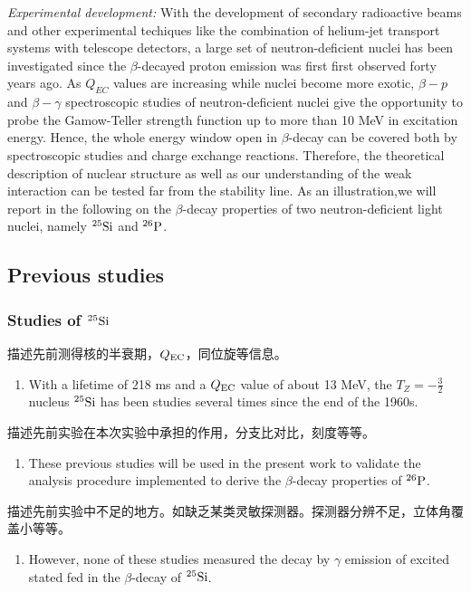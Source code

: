 \documentclass[UTF8]{ctexart}
\begin{document}
\textit{Experimental development:} With the development of secondary radioactive beams and other experimental techiques like the combination of helium-jet transport systems with telescope detectors, a large set of neutron-deficient nuclei has been investigated since the $\beta$-decayed proton emission was first first observed forty years ago. As $Q_{EC}$ values are increasing while nuclei become more exotic, $\beta-p$ and $\beta-\gamma$ spectroscopic studies of neutron-deficient nuclei give the opportunity to probe the Gamow-Teller strength function up to more than 10 MeV in excitation energy. Hence, the whole energy window open in $\beta$-decay can be covered both by spectroscopic studies and charge exchange reactions. Therefore, the theoretical description of nuclear structure as well as our understanding of the weak interaction can be tested far from the stability line. As an illustration,we will report in the following on the $\beta$-decay properties of two neutron-deficient light nuclei, namely $^{25}\textnormal{Si}$ and $^{26}\textnormal{P}$.

\subsection{Previous studies}
\subsubsection{Studies of $^{25}\textnormal{Si}$}
描述先前测得核的半衰期，$Q_{\textnormal{EC}}$，同位旋等信息。
\begin{enumerate}
    \item With a lifetime of 218 ms and a $Q_{\textnormal{EC}}$ value of about 13 MeV, the $T_{Z}=-\frac{3}{2}$ nucleus $^{25}\textnormal{Si}$ has been studies several times since the end of the 1960s. 
\end{enumerate}

描述先前实验在本次实验中承担的作用，分支比对比，刻度等等。
\begin{enumerate}
    \item These previous studies will be used in the present work to validate the analysis procedure implemented to derive the $\beta$-decay properties of $^{26}\textnormal{P}$. 
\end{enumerate}

描述先前实验中不足的地方。如缺乏某类灵敏探测器。探测器分辨不足，立体角覆盖小等等。
\begin{enumerate}
    \item However, none of these studies measured the decay by $\gamma$ emission of excited stated fed in the $\beta$-decay of $^{25}\textnormal{Si}$.
\end{enumerate}
\end{document}
